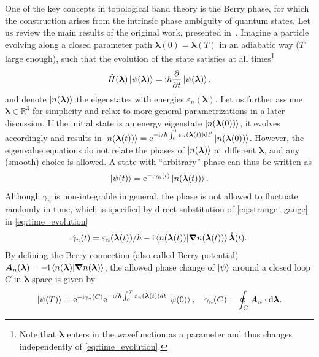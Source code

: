 One of the key concepts in topological band theory is the Berry phase, for which the construction arises from the intrinsic phase ambiguity of quantum states.
Let us review the main results of the original work, presented in~\cite{Berry1984}.
Imagine a particle evolving along a closed parameter path ${\bm \lambda}(0)={\bm \lambda}(T)$ in an adiabatic way ($T$ large enough), such that the evolution of the state satisfies at all times\footnote{Note that $\bm \lambda$ enters in the wavefunction as a parameter and thus changes independently of \cref{eq:time_evolution}.}
\begin{align}
    \hat H(\bm \lambda)\ket{\psi(\bm \lambda)} = \mathrm i\hbar\frac{\partial}{\partial t}\ket{\psi({\bm \lambda})},
    \label{eq:time_evolution}
\end{align}
and denote $\ket{n(\bm \lambda)}$ the eigenstates with energies $\varepsilon_n(\bm \lambda)$.
Let us further assume $\bm \lambda\in\mathds R^3$ for simplicity and relax to more general parametrizations in a later discussion.
If the initial state is an energy eigenstate $\ket{n(\bm \lambda(0))}$, it evolves accordingly and results in $\ket{n(\bm \lambda(t))}=\mathrm e^{-\mathrm i/\hbar\int_0^t \varepsilon_n(\bm \lambda(t))\mathrm d t'}\ket{n(\bm \lambda(0))}$.
However, the eigenvalue equations do not relate the phases of $\ket{n(\bm \lambda)}$ at different $\bm \lambda$, and any (smooth) choice is allowed.
A state with ``arbitrary'' phase can thus be written as
\begin{align}
    \ket{\psi(t)} = \mathrm e^{-\mathrm i\gamma_n(t)}\ket{n(\bm \lambda(t))}.
    \label{eq:strange_gauge}
\end{align}
Although $\gamma_n$ is non-integrable in general, the phase is not allowed to fluctuate randomly in time, which is specified by direct substitution of \cref{eq:strange_gauge} in \cref{eq:time_evolution}
\begin{align}
    \dot\gamma_n(t) = \varepsilon_n(\bm \lambda(t))/\hbar -\mathrm i \braket{n({\bm \lambda(t)})|\bm\nabla n({\bm \lambda(t)})} \dot{\bm \lambda}(t).
    \label{eq:phase_evolution}
\end{align}
By defining the Berry connection (also called Berry potential) {$\bm A_n(\bm \lambda) = -\mathrm i \braket{n(\bm \lambda)|\bm\nabla n(\bm \lambda)}$}, the allowed phase change of $\ket\psi$ around a closed loop $C$ in $\bm \lambda$-space is given by
\begin{align}
    \ket{\psi(T)} = \mathrm e^{-\mathrm i \gamma_n(C)}\mathrm e^{-\mathrm i/\hbar\int_0^T\varepsilon_n(\bm \lambda(t))dt}\ket{\psi(0)}
    ,\quad
    \gamma_n(C) = \oint_C{\bm A_n}\cdot\mathrm d \bm \lambda.
    \label{eq:phase_change}
\end{align}
